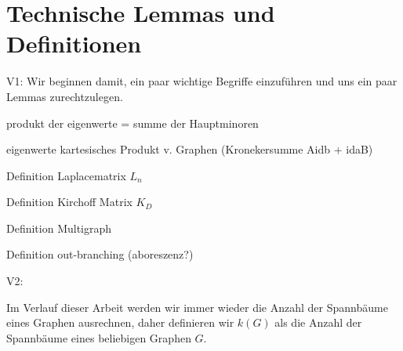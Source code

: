 \graphicspath{{grafiken/tLuD/}}

\section{Technische Lemmas und Definitionen}
V1:
Wir beginnen damit, ein paar wichtige Begriffe einzuführen und uns ein paar Lemmas zurechtzulegen.
\begin{Lm}
 produkt der eigenwerte = summe der Hauptminoren
\end{Lm}

\begin{Lm}
eigenwerte kartesisches Produkt v. Graphen (Kronekersumme Aidb + idaB)
\end{Lm}

\begin{Df}
Definition Laplacematrix $L_n$
\end{Df}

\begin{Dfs}
 Definition Kirchoff Matrix $K_D$
\end{Dfs}

\begin{Dfs}
 Definition Multigraph
\end{Dfs}

\begin{Dfs}
 Definition out-branching (aboreszenz?)
\end{Dfs} 

V2:

Im Verlauf dieser Arbeit werden wir immer wieder die Anzahl der Spannbäume eines Graphen ausrechnen, daher definieren wir $\mathit{k}(G)$ als die Anzahl der Spannbäume eines beliebigen Graphen $G$.
